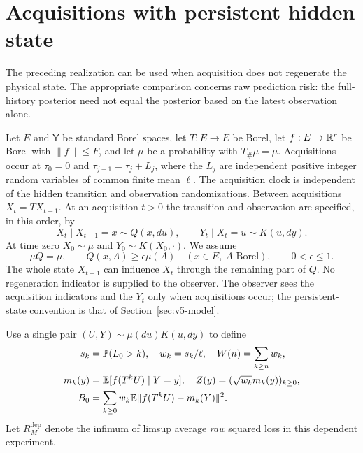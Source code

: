\section{Acquisitions with persistent hidden state}\label{sec:v5-dependent}
The preceding realization can be used when acquisition does not
regenerate the physical state. The appropriate comparison concerns
raw prediction risk: the full-history posterior need not equal the
posterior based on the latest observation alone.

Let $E$ and $\mathsf Y$ be standard Borel spaces, let $T:E\to E$
be Borel, let $f:E\to\mathbb R^r$ be Borel with $\|f\|\le F$, and let
$\mu$ be a probability with $T_\#\mu=\mu$. Acquisitions occur at
$\tau_0=0$ and $\tau_{j+1}=\tau_j+L_j$, where the $L_j$ are
independent positive integer random variables of common finite
mean $\ell$. The acquisition clock is independent of the hidden
transition and observation randomizations. Between acquisitions
$X_t=TX_{t-1}$. At an acquisition $t>0$ the transition and
observation are specified, in this order, by
\begin{equation}\label{eq:v5-dependentkernel}
 X_t\mid X_{t-1}=x\sim Q(x,du),\qquad
 Y_t\mid X_t=u\sim K(u,dy).
\end{equation}
At time zero $X_0\sim\mu$ and $Y_0\sim K(X_0,\cdot)$.
We assume
\begin{equation}\label{eq:v5-minorization}
 \mu Q=\mu,\qquad Q(x,A)\ge\epsilon\mu(A)
 \quad(x\in E,\ A\text{ Borel}),\qquad 0<\epsilon\le1.
\end{equation}
The whole state $X_{t-1}$ can influence $X_t$ through the remaining
part of $Q$. No regeneration indicator is supplied to the observer.
The observer sees the acquisition indicators and the $Y_t$ only
when acquisitions occur; the persistent-state convention is that
of Section~\ref{sec:v5-model}.

Use a single pair $(U,Y)\sim\mu(du)K(u,dy)$ to define
\begin{align}
 s_k&=\mathbb P(L_0>k),\quad w_k=s_k/\ell,\quad
 W(n)=\sum_{k\ge n}w_k,\nonumber\\
 m_k(y)&=\mathbb E[f(T^kU)\mid Y=y],\quad
 Z(y)=(\sqrt{w_k}m_k(y))_{k\ge0},\label{eq:v5-dependentorbit}\\
 B_0&=\sum_{k\ge0}w_k\mathbb E\|f(T^kU)-m_k(Y)\|^2.\nonumber
\end{align}
Let $R_M^{\mathrm{dep}}$ denote the infimum of limsup average
\emph{raw} squared loss in this dependent experiment.

